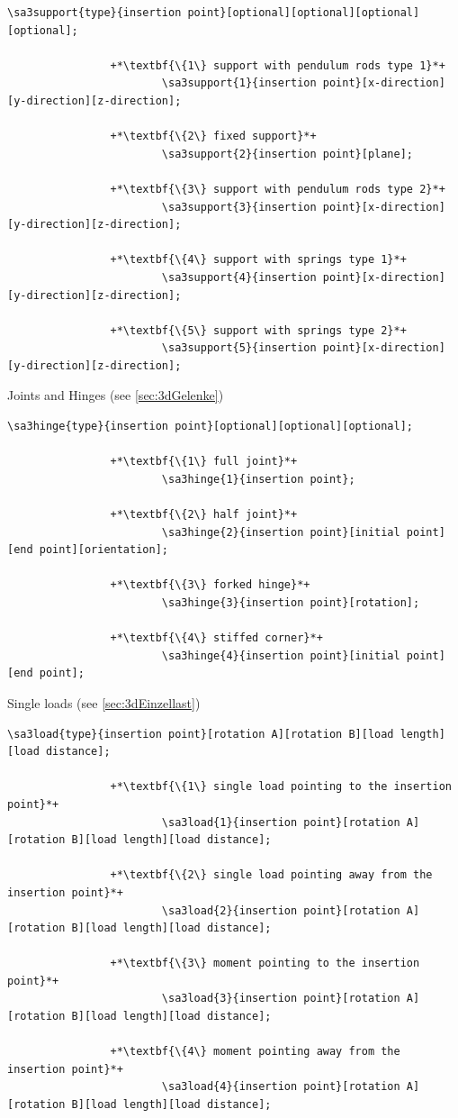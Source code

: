 \documentclass[%
  a4paper,
  BCOR=20mm,
  numbers=noenddot,
  twoside,
  parskip=half,
  openright,
  version=last,
]{scrreprt}
\begin{document}
\begin{lstlisting}[emph={dsupport},backgroundcolor=\color{white}]
		\sa3support{type}{insertion point}[optional][optional][optional][optional];
		
				+*\textbf{\{1\} support with pendulum rods type 1}*+
						\sa3support{1}{insertion point}[x-direction][y-direction][z-direction];
						
				+*\textbf{\{2\} fixed support}*+
						\sa3support{2}{insertion point}[plane];
						
				+*\textbf{\{3\} support with pendulum rods type 2}*+
						\sa3support{3}{insertion point}[x-direction][y-direction][z-direction];
						
				+*\textbf{\{4\} support with springs type 1}*+
						\sa3support{4}{insertion point}[x-direction][y-direction][z-direction];
		
				+*\textbf{\{5\} support with springs type 2}*+
						\sa3support{5}{insertion point}[x-direction][y-direction][z-direction];
\end{lstlisting}\vspace{-10mm}

Joints and Hinges (see \ref{sec:3dGelenke})

\begin{lstlisting}[emph={dhinge},backgroundcolor=\color{white}]
		\sa3hinge{type}{insertion point}[optional][optional][optional];
		
				+*\textbf{\{1\} full joint}*+
						\sa3hinge{1}{insertion point};
						
				+*\textbf{\{2\} half joint}*+
						\sa3hinge{2}{insertion point}[initial point][end point][orientation];
						
				+*\textbf{\{3\} forked hinge}*+
						\sa3hinge{3}{insertion point}[rotation];
		
				+*\textbf{\{4\} stiffed corner}*+
						\sa3hinge{4}{insertion point}[initial point][end point];								
\end{lstlisting}\vspace{-10mm}

Single loads (see \ref{sec:3dEinzellast})

\begin{lstlisting}[emph={dload},backgroundcolor=\color{white}]
		\sa3load{type}{insertion point}[rotation A][rotation B][load length][load distance];
		
				+*\textbf{\{1\} single load pointing to the insertion point}*+
						\sa3load{1}{insertion point}[rotation A][rotation B][load length][load distance];
						
				+*\textbf{\{2\} single load pointing away from the insertion point}*+
						\sa3load{2}{insertion point}[rotation A][rotation B][load length][load distance];
						
				+*\textbf{\{3\} moment pointing to the insertion point}*+
						\sa3load{3}{insertion point}[rotation A][rotation B][load length][load distance];
						
				+*\textbf{\{4\} moment pointing away from the insertion point}*+
						\sa3load{4}{insertion point}[rotation A][rotation B][load length][load distance];
\end{lstlisting}\vspace{-10mm}
\end{document}
